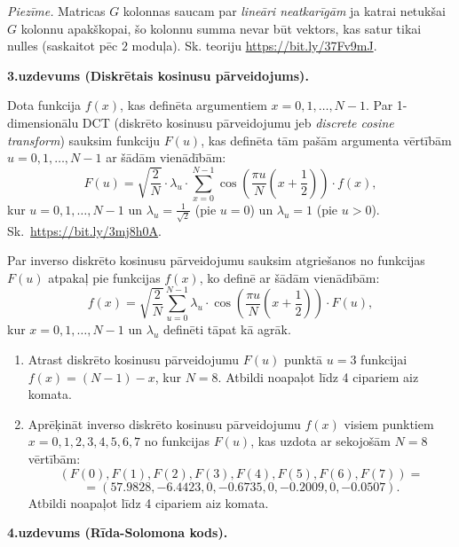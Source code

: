 \documentclass[a4paper,12pt]{article}
\begin{document}
{\em Piezīme.} Matricas $G$ kolonnas saucam par {\em lineāri neatkarīgām} 
ja katrai netukšai $G$ kolonnu apakš\-ko\-pai, šo kolonnu summa nevar būt vektors, 
kas satur tikai nulles (saskaitot pēc $2$ moduļa).
Sk. teoriju \url{https://bit.ly/37Fv9mJ}.


\vspace{20pt}
{\bf 3.uzdevums (Diskrētais kosinusu pārveidojums).}

Dota funkcija $f(x)$, kas definēta argumentiem $x=0,1,\ldots,N-1$.
Par 1-dimensionālu DCT (diskrēto kosinusu pārveidojumu jeb {\em discrete cosine transform}) sauksim
funkciju $F(u)$, kas definēta tām pašām argumenta vērtībām $u=0,1,\ldots,N-1$
ar šādām vienādībām:
$$F(u) = \sqrt{\frac{2}{N}} \cdot \lambda_u \cdot \sum\limits_{x=0}^{N-1} \cos \left( \frac{\pi u}{N}\left(  x+\frac{1}{2} \right) \right) \cdot f(x),$$
kur $u=0,1,\ldots,N-1$ un $\lambda_u = \frac{1}{\sqrt{2}}$ (pie $u=0$) un $\lambda_u = 1$ (pie $u>0$).\\
Sk.\ \url{https://bit.ly/3mj8h0A}.

Par inverso diskrēto kosinusu pārveidojumu sauksim atgriešanos no funkcijas $F(u)$ atpakaļ pie funk\-ci\-jas $f(x)$,
ko definē ar šādām vienādībām:
$$f(x) = \sqrt{\frac{2}{N}} \sum\limits_{u=0}^{N-1} \lambda_u \cdot \cos \left( \frac{\pi u}{N}\left(  x+\frac{1}{2} \right) \right) \cdot F(u),$$
kur $x=0,1,\ldots,N-1$ un $\lambda_u$ definēti tāpat kā agrāk.

\begin{enumerate}
\item
Atrast diskrēto kosinusu pārveidojumu $F(u)$ punktā $u=3$
funkcijai\\ $f(x) = (N-1)-x$, kur $N=8$.
Atbildi noapaļot līdz 4 cipariem aiz komata.
\item
Aprēķināt inverso diskrēto kosinusu pārveidojumu $f(x)$ visiem
punktiem\\ $x=0,1,2,3,4,5,6,7$ no funkcijas $F(u)$, kas uzdota ar
sekojošām $N=8$ vērtībām:
{\footnotesize
$$(F(0),F(1),F(2),F(3),F(4),F(5),F(6),F(7)) =$$
$$ = (57.9828,-6.4423,0,-0.6735,0,-0.2009,0,-0.0507).$$
}
Atbildi noapaļot līdz 4 cipariem aiz komata.
\end{enumerate}






\vspace{20pt}
{\bf 4.uzdevums (Rīda-Solomona kods).}
\end{document}
